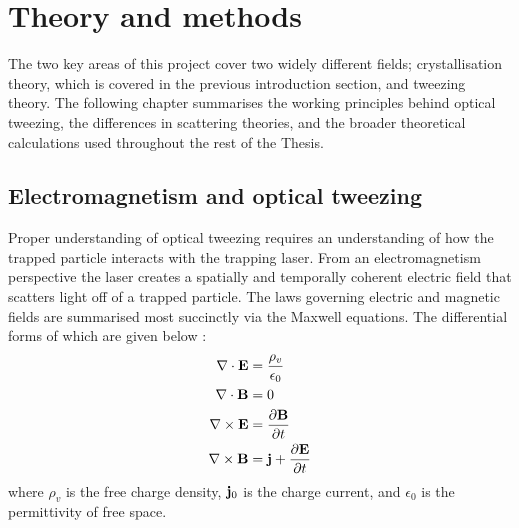 \chapter{Theory and methods}
\label{chapter:theory}
The two key areas of this project cover two widely different fields; 
crystallisation theory, which is covered in the previous introduction 
section, and tweezing theory. The following chapter summarises the 
working principles behind optical tweezing, the differences in 
scattering theories, and the broader theoretical calculations used
throughout the rest of the Thesis.

\section{Electromagnetism and optical tweezing}

Proper understanding of optical tweezing requires an understanding of
how the trapped particle interacts with the trapping laser. From an 
electromagnetism perspective the laser creates a spatially and 
temporally coherent electric field that scatters light off of a 
trapped particle.  The laws governing electric and magnetic fields 
are summarised most succinctly via the Maxwell equations. The 
differential forms of which are given below \cite{Jackson_1975}:
\begin{align}
  \nabla \cdot \mathbf{E}
  &= \frac{\rho_ v}{\epsilon_0}
  \\
  \nabla \cdot \mathbf{B}
  &= 0
  \\
  \nabla \times \mathbf{E}
  &= \frac{\partial \mathbf{B}}{\partial t}
  \\
  \nabla \times \mathbf{B}
  &= {\bf j} +\frac{\partial \mathbf{E}}{\partial t}    
\end{align}
where $\rho_v$ is the free charge density, ${\bf j}_0$ is the charge
current, and $\epsilon_0$ is the permittivity of free space. 

